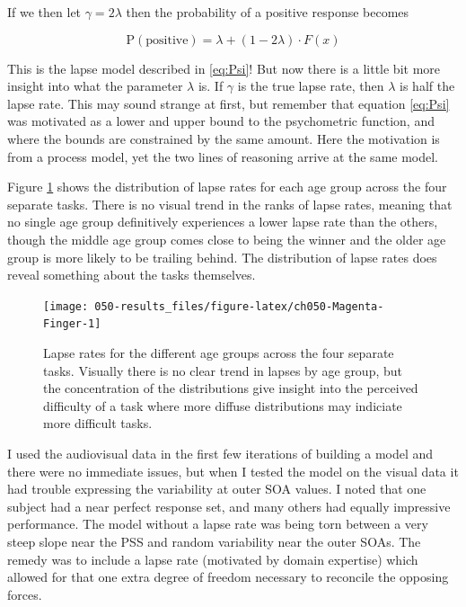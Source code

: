 \documentclass[11pt, oneside, openany]{scrbook}
\begin{document}
If we then let \(\gamma = 2\lambda\) then the probability of a positive response becomes

\[
\mathrm{P}(\textrm{positive}) = \lambda + (1 - 2\lambda) \cdot F(x)
\]

This is the lapse model described in \eqref{eq:Psi}! But now there is a little bit more insight into what the parameter \(\lambda\) is. If \(\gamma\) is the true lapse rate, then \(\lambda\) is half the lapse rate. This may sound strange at first, but remember that equation \eqref{eq:Psi} was motivated as a lower and upper bound to the psychometric function, and where the bounds are constrained by the same amount. Here the motivation is from a process model, yet the two lines of reasoning arrive at the same model.

Figure \ref{fig:ch050-Magenta-Finger} shows the distribution of lapse rates for each age group across the four separate tasks. There is no visual trend in the ranks of lapse rates, meaning that no single age group definitively experiences a lower lapse rate than the others, though the middle age group comes close to being the winner and the older age group is more likely to be trailing behind. The distribution of lapse rates does reveal something about the tasks themselves.

\begin{figure}

{\centering \texttt{[image: 050-results\_files/figure-latex/ch050-Magenta-Finger-1]} 

}

\caption{Lapse rates for the different age groups across the four separate tasks. Visually there is no clear trend in lapses by age group, but the concentration of the distributions give insight into the perceived difficulty of a task where more diffuse distributions may indiciate more difficult tasks.}\label{fig:ch050-Magenta-Finger}
\end{figure}

I used the audiovisual data in the first few iterations of building a model and there were no immediate issues, but when I tested the model on the visual data it had trouble expressing the variability at outer SOA values. I noted that one subject had a near perfect response set, and many others had equally impressive performance. The model without a lapse rate was being torn between a very steep slope near the PSS and random variability near the outer SOAs. The remedy was to include a lapse rate (motivated by domain expertise) which allowed for that one extra degree of freedom necessary to reconcile the opposing forces.
\end{document}
